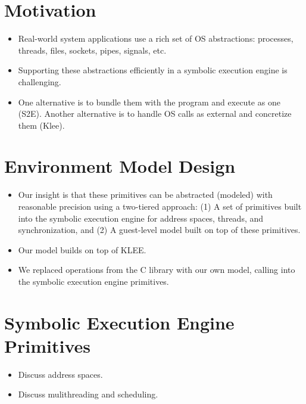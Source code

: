 \section{Motivation}

\begin{itemize}
\item Real-world system applications use a rich set of OS abstractions: processes, threads, files, sockets, pipes, signals, etc.
\item Supporting these abstractions efficiently in a symbolic execution engine is challenging.
\item One alternative is to bundle them with the program and execute as one (S2E). Another alternative is to handle OS calls as external and concretize them (Klee).
\end{itemize}


\section{Environment Model Design}

\begin{itemize}
\item Our insight is that these primitives can be abstracted (modeled) with reasonable precision using a two-tiered approach: (1) A set of primitives built into the symbolic execution engine for address spaces, threads, and synchronization, and (2) A guest-level model built on top of these primitives.
\item Our model builds on top of KLEE.
\item We replaced operations from the C library with our own model, calling into the symbolic execution engine primitives.
\end{itemize}


\section{Symbolic Execution Engine Primitives}

\begin{itemize}
\item Discuss address spaces.
\item Discuss mulithreading and scheduling.
\end{itemize}

